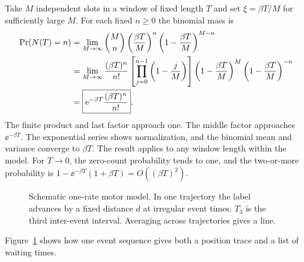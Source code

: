 Take $M$ independent slots in a window of fixed length $T$ and set $\xi=\beta T/M$ for sufficiently large $M$. For each fixed $n\ge0$ the binomial mass is
\begin{align}
 \Pr(N(T)=n)
 &=\lim_{M\to\infty}\binom{M}{n}
       \left(\frac{\beta T}{M}\right)^n
       \left(1-\frac{\beta T}{M}\right)^{M-n}\notag\\
 &=\lim_{M\to\infty}\frac{(\beta T)^n}{n!}
       \left[\prod_{j=0}^{n-1}\left(1-\frac{j}{M}\right)\right]
       \left(1-\frac{\beta T}{M}\right)^M
       \left(1-\frac{\beta T}{M}\right)^{-n}\notag\\
 &=\boxed{\mathrm{e}^{-\beta T}\frac{(\beta T)^n}{n!}}.
 \label{eq:l06-poisson-counts}
\end{align}
The finite product and last factor approach one. The middle factor approaches $\ee^{-\beta T}$. The exponential series shows normalization, and the binomial mean and variance converge to $\beta T$. The result applies to any window length within the model. For $T\to0$, the zero-count probability tends to one, and the two-or-more probability is $1-\ee^{-\beta T}(1+\beta T)=O((\beta T)^2)$.

\begin{figure}[htbp]
\centering
{}
\caption{Schematic one-rate motor model. In one trajectory the label advances by a fixed distance $d$ at irregular event times. $T_3$ is the third inter-event interval. Averaging across trajectories gives a line.}
\label{fig:l06-staircase}
\end{figure}

Figure~\ref{fig:l06-staircase} shows how one event sequence gives both a position trace and a list of waiting times.

